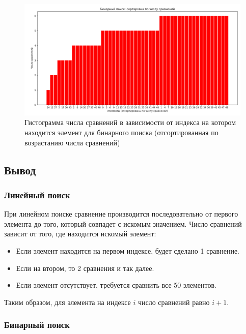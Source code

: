 \begin{figure}[H]
    \centering
    \includegraphics[width=1\textwidth]{img/bar_graph_binary_sort.png}
    \caption{Гистограмма числа сравнений в зависимости от индекса на котором находится элемент для бинарного поиска (отсортированная по возрастанию числа сравнений)}
    \label{fig:bar_graph_binary_sort} %
\end{figure}

\subsection*{Вывод}

\subsubsection*{Линейный поиск}

\hspace{1.25cm}
При линейном поиске сравнение производится последовательно от первого элемента до того, который совпадет с искомым значением. Число сравнений зависит от того, где находится искомый элемент:

\begin{itemize}
    \item Если элемент находится на первом индексе, будет сделано 1 сравнение.
    \item Если на втором, то 2 сравнения и так далее.
    \item Если элемент отсутствует, требуется сравнить все 50 элементов.
\end{itemize}

Таким образом, для элемента на индексе \(i\) число сравнений равно \(i + 1\).

\subsubsection*{Бинарный поиск}

